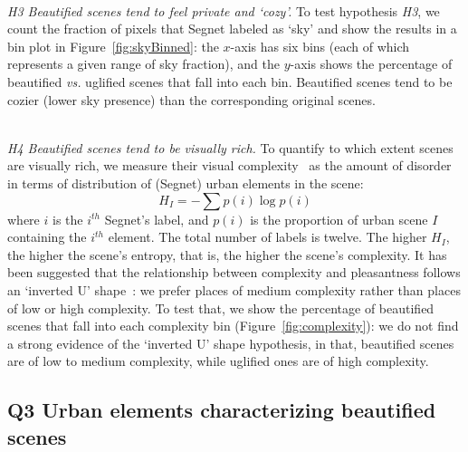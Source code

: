 \mbox{ } \\
\noindent
\emph{H3 Beautified scenes tend to feel private and `cozy'.}
To  test hypothesis \emph{H3}, we count the fraction of pixels that Segnet labeled  as `sky' and show the results in a bin plot in Figure~\ref{fig:skyBinned}:  the $x$-axis has six bins (each of which represents a given range of sky fraction), and the $y$-axis shows the percentage of beautified \emph{vs.} uglified scenes that fall into each bin.  Beautified scenes tend to be cozier (lower sky presence) than the corresponding original scenes.


\mbox{ } \\
\noindent
\emph{H4 Beautified scenes tend to be visually rich.}
To quantify to which extent scenes are visually rich, we measure their visual complexity~\cite{ewing2013measuring} as  the amount of disorder in terms of distribution of (Segnet) urban elements in the scene: 
\begin{equation}
H_I = -\sum p(i)\log p(i)
\label{eq:entropy} 
\end{equation}
where $i$ is the $i^{th}$ Segnet's label, and $p(i)$ is the proportion of urban scene $I$ containing
the $i^{th}$ element. The total number of labels is twelve. The higher $H_I$, the  higher the scene's entropy, that is, the higher the scene's complexity. It has been suggested that the relationship between complexity and  pleasantness follows an `inverted U' shape~\cite{ulrich1983aesthetic}: we prefer places of medium complexity rather than places of low or high complexity. To test that, we show the percentage of beautified scenes that fall into each complexity bin  (Figure~\ref{fig:complexity}):  we do not find a strong evidence of the `inverted U' shape hypothesis, in that, beautified scenes are of low to medium complexity, while uglified ones are of high complexity.



\subsection*{Q3 Urban elements characterizing beautified scenes}

